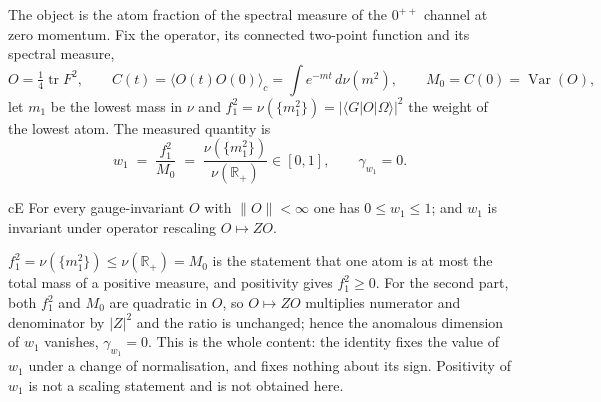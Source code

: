 The object is the atom fraction of the spectral measure of the $0^{++}$ channel at zero momentum.
Fix the operator, its connected two-point function and its spectral measure,
\begin{equation}
O=\tfrac14\operatorname{tr}F^2,
\qquad
C(t)=\langle O(t)O(0)\rangle_c=\int e^{-mt}\,d\nu(m^2),
\qquad
M_0=C(0)=\operatorname{Var}(O),
\label{eq:m-defs}
\end{equation}
let $m_1$ be the lowest mass in $\nu$ and $f_1^2=\nu(\{m_1^2\})=|\langle G|O|\Omega\rangle|^2$ the
weight of the lowest atom. The measured quantity is
\begin{equation}
w_1 \;=\; \frac{f_1^2}{M_0} \;=\; \frac{\nu(\{m_1^2\})}{\nu(\mathbb{R}_+)}\in[0,1],
\qquad
\gamma_{w_1}=0 .
\label{eq:m-w1}
\end{equation}

\begin{claimbox}{cE}
For every gauge-invariant $O$ with $\|O\|<\infty$ one has $0\le w_1\le1$; and $w_1$ is invariant
under operator rescaling $O\mapsto ZO$.
\end{claimbox}

\begin{proofx}
$f_1^2=\nu(\{m_1^2\})\le\nu(\mathbb{R}_+)=M_0$ is the statement that one atom is at most the total
mass of a positive measure, and positivity gives $f_1^2\ge0$. For the second part, both $f_1^2$ and
$M_0$ are quadratic in $O$, so $O\mapsto ZO$ multiplies numerator and denominator by $|Z|^2$ and the
ratio is unchanged; hence the anomalous dimension of $w_1$ vanishes, $\gamma_{w_1}=0$. This is the
whole content: the identity fixes the value of $w_1$ under a change of normalisation, and fixes
nothing about its sign. Positivity of $w_1$ is not a scaling statement and is not obtained here.
\end{proofx}

